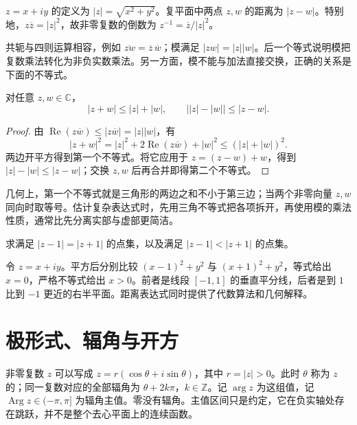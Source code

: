 \documentclass[UTF8,12pt,a4paper,fontset=fandol]{ctexbook}
\begin{document}
\begin{definition}[模与距离]
$z=x+iy$ 的定义为 $|z|=\sqrt{x^2+y^2}$。复平面中两点 $z,w$ 的距离为 $|z-w|$。特别地，$z\overline z=|z|^2$，故非零复数的倒数为 $z^{-1}=\overline z/|z|^2$。
\end{definition}

共轭与四则运算相容，例如 $\overline{zw}=\overline z\,\overline w$；模满足 $|zw|=|z||w|$。后一个等式说明模把复数乘法转化为非负实数乘法。另一方面，模不能与加法直接交换，正确的关系是下面的不等式。

\begin{proposition}[三角不等式]
对任意 $z,w\in\mathbb C$，
\begin{equation}
 |z+w|\le |z|+|w|,\qquad
 \bigl||z|-|w|\bigr|\le |z-w|.
 \label{eq:cv-triangle}
\end{equation}
\end{proposition}
\begin{proof}
由 $\operatorname{Re}(z\overline w)\le|z\overline w|=|z||w|$，有
\[
 |z+w|^2=|z|^2+2\operatorname{Re}(z\overline w)+|w|^2
 \le(|z|+|w|)^2.
\]
两边开平方得到第一个不等式。将它应用于 $z=(z-w)+w$，得到 $|z|-|w|\le|z-w|$；交换 $z,w$ 后再合并即得第二个不等式。
\end{proof}

几何上，第一个不等式就是三角形的两边之和不小于第三边；当两个非零向量 $z,w$ 同向时取等号。估计复杂表达式时，先用三角不等式把各项拆开，再使用模的乘法性质，通常比先分离实部与虚部更简洁。

\begin{example}[从复数方程读出几何轨迹]
求满足 $|z-1|=|z+1|$ 的点集，以及满足 $|z-1|<|z+1|$ 的点集。
\end{example}
\begin{solve}
令 $z=x+iy$。平方后分别比较 $(x-1)^2+y^2$ 与 $(x+1)^2+y^2$，等式给出 $x=0$，严格不等式给出 $x>0$。前者是线段 $[-1,1]$ 的垂直平分线，后者是到 $1$ 比到 $-1$ 更近的右半平面。距离表达式同时提供了代数算法和几何解释。
\end{solve}

\section{极形式、辐角与开方}

非零复数 $z$ 可以写成 $z=r(\cos\theta+i\sin\theta)$，其中 $r=|z|>0$。此时 $\theta$ 称为 $z$ 的；同一复数对应的全部辐角为 $\theta+2k\pi$，$k\in\mathbb Z$。记 $\arg z$ 为这组值，记 $\operatorname{Arg}z\in(-\pi,\pi]$ 为辐角主值。零没有辐角。主值区间只是约定，它在负实轴处存在跳跃，并不是整个去心平面上的连续函数。
\end{document}
